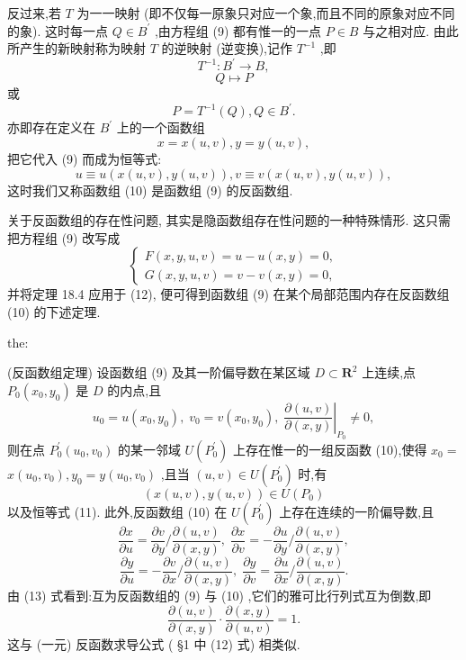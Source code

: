 反过来,若 \(T\) 为一一映射 (即不仅每一原象只对应一个象,而且不同的原象对应不同的象). 这时每一点 \(Q \in  {B}^{\prime }\) ,由方程组 (9) 都有惟一的一点 \(P \in  B\) 与之相对应. 由此所产生的新映射称为映射 \(T\) 的逆映射 (逆变换),记作 \({T}^{-1}\) ,即
\[
{T}^{-1} : {B}^{\prime } \rightarrow  B,
\]
\[
Q \mapsto  P
\]
或
\[
P = {T}^{-1}\left( Q\right) ,Q \in  {B}^{\prime }.
\]
亦即存在定义在 \({B}^{\prime }\) 上的一个函数组
\[
x = x\left( {u,v}\right) ,y = y\left( {u,v}\right) , \tag{10}
\]
把它代入 (9) 而成为恒等式:
\[
u \equiv  u\left( {x\left( {u,v}\right) ,y\left( {u,v}\right) }\right) ,v \equiv  v\left( {x\left( {u,v}\right) ,y\left( {u,v}\right) }\right) , \tag{11}
\]
这时我们又称函数组 (10) 是函数组 (9) 的反函数组.

关于反函数组的存在性问题, 其实是隐函数组存在性问题的一种特殊情形. 这只需把方程组 (9) 改写成
\[
\left\{  \begin{array}{l} F\left( {x,y,u,v}\right)  = u - u\left( {x,y}\right)  = 0, \\  G\left( {x,y,u,v}\right)  = v - v\left( {x,y}\right)  = 0, \end{array}\right.  \tag{12}
\]
并将定理 18.4 应用于 (12), 便可得到函数组 (9) 在某个局部范围内存在反函数组 (10) 的下述定理.

\begin{theorem}{}{the:}

\end{theorem}
 (反函数组定理) 设函数组 (9) 及其一阶偏导数在某区域 \(D \subset  {\mathbf{R}}^{2}\) 上连续,点 \({P}_{0}\left( {{x}_{0},{y}_{0}}\right)\) 是 \(D\) 的内点,且
\[
{u}_{0} = u\left( {{x}_{0},{y}_{0}}\right) ,\;{v}_{0} = v\left( {{x}_{0},{y}_{0}}\right) ,{\left. \;\frac{\partial \left( {u,v}\right) }{\partial \left( {x,y}\right) }\right| }_{{P}_{0}} \neq  0,
\]
则在点 \({P}_{0}^{\prime }\left( {{u}_{0},{v}_{0}}\right)\) 的某一邻域 \(U\left( {P}_{0}^{\prime }\right)\) 上存在惟一的一组反函数 (10),使得 \({x}_{0} =\)  \(x\left( {{u}_{0},{v}_{0}}\right) ,{y}_{0} = y\left( {{u}_{0},{v}_{0}}\right)\) ,且当 \(\left( {u,v}\right)  \in  U\left( {P}_{0}^{\prime }\right)\) 时,有
\[
\left( {x\left( {u,v}\right) ,y\left( {u,v}\right) }\right)  \in  U\left( {P}_{0}\right)
\]
以及恒等式 (11). 此外,反函数组 (10) 在 \(U\left( {P}_{0}^{\prime }\right)\) 上存在连续的一阶偏导数,且
\[
\frac{\partial x}{\partial u} = \frac{\partial v}{\partial y}/\frac{\partial \left( {u,v}\right) }{\partial \left( {x,y}\right) },\;\frac{\partial x}{\partial v} =  - \frac{\partial u}{\partial y}/\frac{\partial \left( {u,v}\right) }{\partial \left( {x,y}\right) },
\]
\[
\frac{\partial y}{\partial u} =  - \frac{\partial v}{\partial x}/\frac{\partial \left( {u,v}\right) }{\partial \left( {x,y}\right) },\;\frac{\partial y}{\partial v} = \frac{\partial u}{\partial x}/\frac{\partial \left( {u,v}\right) }{\partial \left( {x,y}\right) }. \tag{13}
\]
由 (13) 式看到:互为反函数组的 (9) 与 (10) ,它们的雅可比行列式互为倒数,即
\[
\frac{\partial \left( {u,v}\right) }{\partial \left( {x,y}\right) } \cdot  \frac{\partial \left( {x,y}\right) }{\partial \left( {u,v}\right) } = 1.
\]
这与 (一元) 反函数求导公式 ( §1 中 (12) 式) 相类似.

